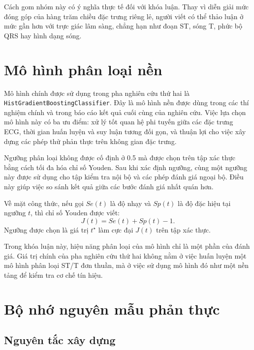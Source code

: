 \blocksep

Cách gom nhóm này có ý nghĩa thực tế đối với khóa luận. Thay vì diễn giải mức đóng góp của hàng trăm chiều đặc trưng riêng lẻ, người viết có thể thảo luận ở mức gần hơn với trực giác lâm sàng, chẳng hạn như đoạn ST, sóng T, phức bộ QRS hay hình dạng sóng.

\section{Mô hình phân loại nền}

\blocksep

Mô hình chính được sử dụng trong pha nghiên cứu thứ hai là \texttt{HistGradient\discretionary{}{}{}Boosting\discretionary{}{}{}Classifier}. Đây là mô hình nền được dùng trong các thí nghiệm chính và trong báo cáo kết quả cuối cùng của nghiên cứu. Việc lựa chọn mô hình này có ba ưu điểm: xử lý tốt quan hệ phi tuyến giữa các đặc trưng ECG, thời gian huấn luyện và suy luận tương đối gọn, và thuận lợi cho việc xây dựng các phép thử phản thực trên không gian đặc trưng.

\blocksep

Ngưỡng phân loại không được cố định ở 0.5 mà được chọn trên tập xác thực bằng cách tối đa hóa chỉ số Youden. Sau khi xác định ngưỡng, cùng một ngưỡng này được sử dụng cho tập kiểm tra nội bộ và các phép đánh giá ngoại bộ. Điều này giúp việc so sánh kết quả giữa các bước đánh giá nhất quán hơn.

\blocksep

Về mặt công thức, nếu gọi $Se(t)$ là độ nhạy và $Sp(t)$ là độ đặc hiệu tại ngưỡng $t$, thì chỉ số Youden được viết:
\[
J(t) = Se(t) + Sp(t) - 1.
\]
Ngưỡng được chọn là giá trị $t^\star$ làm cực đại $J(t)$ trên tập xác thực.

\blocksep

Trong khóa luận này, hiệu năng phân loại của mô hình chỉ là một phần của đánh giá. Giá trị chính của pha nghiên cứu thứ hai không nằm ở việc huấn luyện một mô hình phân loại ST/T đơn thuần, mà ở việc sử dụng mô hình đó như một nền tảng để kiểm tra cơ chế tín hiệu.

\section{Bộ nhớ nguyên mẫu phản thực}

\blocksep

\subsection{Nguyên tắc xây dựng}

